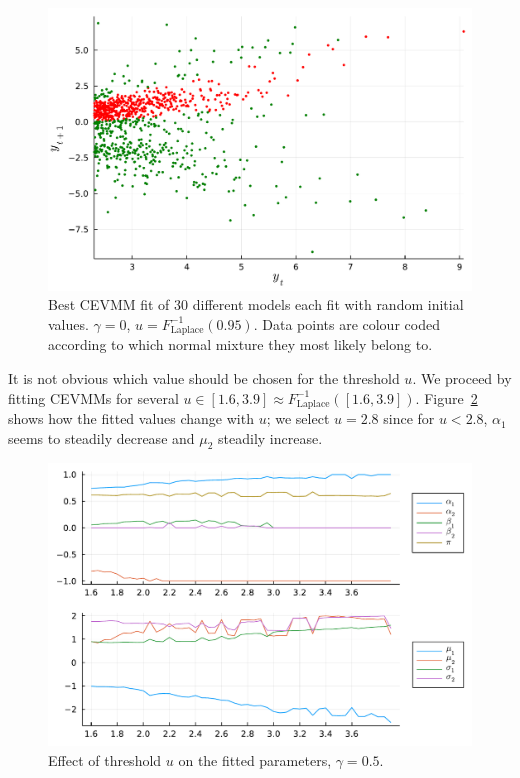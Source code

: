 \documentclass[11pt,twoside,openany]{book}
\numberwithin{Theorem}{chapter}
\numberwithin{Definition}{chapter}
\numberwithin{Lemma}{chapter}
\numberwithin{Algorithm}{chapter}
\numberwithin{equation}{chapter}
\begin{document}
\begin{figure}[htp]
  \centering
  \includegraphics[scale=0.75]{../elexon/figures/seed_18.pdf}
  \caption{Best CEVMM fit of 30 different models each fit with random initial values.
    $\gamma=0$, $u=F_{\text{Laplace}}^{-1}(0.95)$. Data points are colour coded according to which normal mixture they most
likely belong to.}\label{fig:seed_18}
\end{figure}

\FloatBarrier
It is not obvious which value should be chosen for the threshold $u$.
We proceed by fitting CEVMMs for several $u\in[1.6,3.9]\approx
F_{\text{Laplace}}^{-1}([1.6,3.9])$. Figure~\ref{fig:imb_param_vals_changing_u}
shows how the fitted values change with $u$; we select $u=2.8$
since for $u<2.8$, $\alpha_1$ seems to steadily decrease and $\mu_2$ steadily increase.



\begin{figure}[htp]
  \centering
  \includegraphics[scale=0.75]{../elexon/figures/imb_param_vals_changing_u.pdf}
  \caption{Effect of threshold $u$ on the fitted parameters, $\gamma=0.5$.}\label{fig:imb_param_vals_changing_u}
\end{figure}
\end{document}
